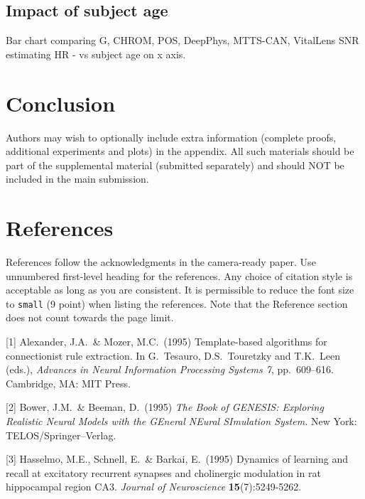 \documentclass{article}
\begin{document}
\subsection{Impact of subject age}

Bar chart comparing G, CHROM, POS, DeepPhys, MTTS-CAN, VitalLens SNR estimating HR - vs subject age on x axis.

\section{Conclusion}

Authors may wish to optionally include extra information (complete proofs, additional experiments and plots) in the appendix. All such materials should be part of the supplemental material (submitted separately) and should NOT be included in the main submission.


\section*{References}


References follow the acknowledgments in the camera-ready paper. Use unnumbered first-level heading for
the references. Any choice of citation style is acceptable as long as you are
consistent. It is permissible to reduce the font size to \verb+small+ (9 point)
when listing the references.
Note that the Reference section does not count towards the page limit.
\medskip


{
\small


[1] Alexander, J.A.\ \& Mozer, M.C.\ (1995) Template-based algorithms for
connectionist rule extraction. In G.\ Tesauro, D.S.\ Touretzky and T.K.\ Leen
(eds.), {\it Advances in Neural Information Processing Systems 7},
pp.\ 609--616. Cambridge, MA: MIT Press.


[2] Bower, J.M.\ \& Beeman, D.\ (1995) {\it The Book of GENESIS: Exploring
  Realistic Neural Models with the GEneral NEural SImulation System.}  New York:
TELOS/Springer--Verlag.


[3] Hasselmo, M.E., Schnell, E.\ \& Barkai, E.\ (1995) Dynamics of learning and
recall at excitatory recurrent synapses and cholinergic modulation in rat
hippocampal region CA3. {\it Journal of Neuroscience} {\bf 15}(7):5249-5262.
}

\end{document}
